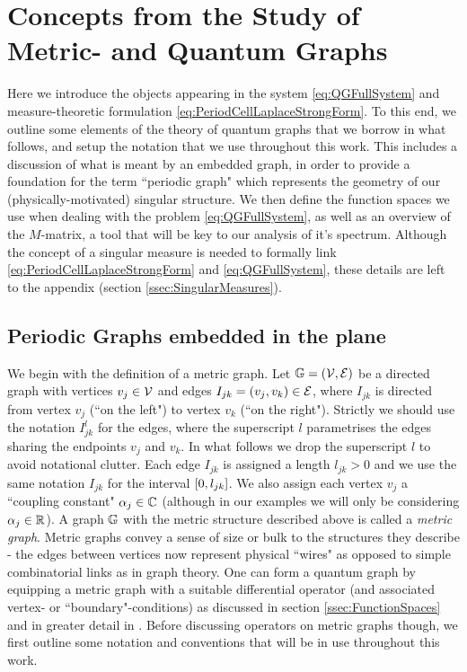 \section{Concepts from the Study of Metric- and Quantum Graphs} \label{sec:QuantumGraphs}
Here we introduce the objects appearing in the system \eqref{eq:QGFullSystem} and measure-theoretic formulation \eqref{eq:PeriodCellLaplaceStrongForm}.
To this end, we outline some elements of the theory of quantum graphs that we borrow in what follows, and setup the notation that we use throughout this work.
This includes a discussion of what is meant by an embedded graph, in order to provide a foundation for the term ``periodic graph" which represents the geometry of our (physically-motivated) singular structure.
We then define the function spaces we use when dealing with the problem \eqref{eq:QGFullSystem}, as well as an overview of the $M$-matrix, a tool that will be key to our analysis of it's spectrum.
Although the concept of a singular measure is needed to formally link \eqref{eq:PeriodCellLaplaceStrongForm} and \eqref{eq:QGFullSystem}, these details are left to the appendix (section \ref{ssec:SingularMeasures}).

\subsection{Periodic Graphs embedded in the plane} \label{ssec:EmbeddedGraphs}
We begin with the definition of a metric graph.
Let $\mathbb{G}=\left( \mathcal{V},\mathcal{E} \right)$ be a directed graph with vertices $v_j\in \mathcal{V}$ and edges $I_{jk}=\left( v_j, v_k \right)\in \mathcal{E}$, where $I_{jk}$ is directed from vertex $v_j$ (``on the left") to vertex $v_k$ (``on the right").
Strictly we should use the notation $I_{jk}^l$ for the edges, where the superscript $l$ parametrises the edges sharing the endpoints $v_j$ and $v_k$.
In what follows we drop the superscript $l$ to avoid notational clutter.
Each edge $I_{jk}$ is assigned a length $l_{jk}>0$ and we use the same notation $I_{jk}$ for the interval $\left[ 0,l_{jk} \right]$.
We also assign each vertex $v_j$ a ``coupling constant" $\alpha_j\in\mathbb{C}$ (although in our examples we will only be considering $\alpha_j\in\mathbb{R}$).
A graph $\mathbb{G}$ with the metric structure described above is called a \emph{metric graph}.
Metric graphs convey a sense of size or bulk to the structures they describe - the edges between vertices now represent physical ``wires" as opposed to simple combinatorial links as in graph theory.
One can form a quantum graph by equipping a metric graph with a suitable differential operator (and associated vertex- or ``boundary"-conditions) as discussed in section \ref{ssec:FunctionSpaces} and in greater detail in \cite{berkolaiko2013introduction}.
Before discussing operators on metric graphs though, we first outline some notation and conventions that will be in use throughout this work. \newline


